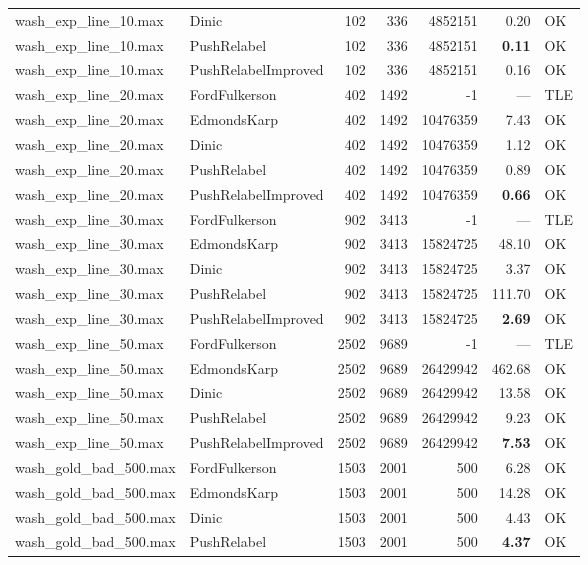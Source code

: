 \begin{longtable}{llrrrrl}
wash\_exp\_line\_10.max & Dinic & 102 & 336 & 4852151 & 0.20 & OK \\
wash\_exp\_line\_10.max & PushRelabel & 102 & 336 & 4852151 & \textbf{0.11} & OK \\
wash\_exp\_line\_10.max & PushRelabelImproved & 102 & 336 & 4852151 & 0.16 & OK \\
\midrule
wash\_exp\_line\_20.max & FordFulkerson & 402 & 1492 & -1 & --- & TLE \\
wash\_exp\_line\_20.max & EdmondsKarp & 402 & 1492 & 10476359 & 7.43 & OK \\
wash\_exp\_line\_20.max & Dinic & 402 & 1492 & 10476359 & 1.12 & OK \\
wash\_exp\_line\_20.max & PushRelabel & 402 & 1492 & 10476359 & 0.89 & OK \\
wash\_exp\_line\_20.max & PushRelabelImproved & 402 & 1492 & 10476359 & \textbf{0.66} & OK \\
\midrule
wash\_exp\_line\_30.max & FordFulkerson & 902 & 3413 & -1 & --- & TLE \\
wash\_exp\_line\_30.max & EdmondsKarp & 902 & 3413 & 15824725 & 48.10 & OK \\
wash\_exp\_line\_30.max & Dinic & 902 & 3413 & 15824725 & 3.37 & OK \\
wash\_exp\_line\_30.max & PushRelabel & 902 & 3413 & 15824725 & 111.70 & OK \\
wash\_exp\_line\_30.max & PushRelabelImproved & 902 & 3413 & 15824725 & \textbf{2.69} & OK \\
\midrule
wash\_exp\_line\_50.max & FordFulkerson & 2502 & 9689 & -1 & --- & TLE \\
wash\_exp\_line\_50.max & EdmondsKarp & 2502 & 9689 & 26429942 & 462.68 & OK \\
wash\_exp\_line\_50.max & Dinic & 2502 & 9689 & 26429942 & 13.58 & OK \\
wash\_exp\_line\_50.max & PushRelabel & 2502 & 9689 & 26429942 & 9.23 & OK \\
wash\_exp\_line\_50.max & PushRelabelImproved & 2502 & 9689 & 26429942 & \textbf{7.53} & OK \\
\midrule
wash\_gold\_bad\_500.max & FordFulkerson & 1503 & 2001 & 500 & 6.28 & OK \\
wash\_gold\_bad\_500.max & EdmondsKarp & 1503 & 2001 & 500 & 14.28 & OK \\
wash\_gold\_bad\_500.max & Dinic & 1503 & 2001 & 500 & 4.43 & OK \\
wash\_gold\_bad\_500.max & PushRelabel & 1503 & 2001 & 500 & \textbf{4.37} & OK \\

\end{longtable}
